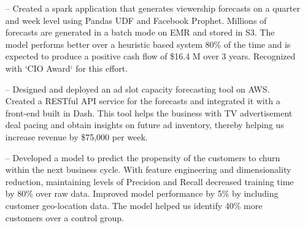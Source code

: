 \documentclass[10pt,a4paper]{altacv}
\begin{document}
\tagline{}

%

\begin{fullwidth}
\makecvheader
\end{fullwidth}

%





\begin{itemize}
    \setlength{\itemindent}{0.5em}
    \item[--]   \small{Created a spark application that generates viewership forecasts on a quarter and week level using Pandas UDF and Facebook Prophet. Millions of forecasts are generated in a batch mode on EMR and stored in S3. The model performs better over a heuristic based system 80\% of the time and is expected to produce a positive cash flow of \$16.4 M over 3 years. Recognized with `CIO Award` for this effort.}
    \item[--]   \small{Designed and deployed an ad slot capacity forecasting tool on AWS. Created a RESTful API service for the forecasts and integrated it with a front-end built in Dash. This tool helps the business with TV advertisement deal pacing and obtain insights on future ad inventory, thereby helping us increase revenue by \$75,000 per week.}
    \item[--]   \small{Developed a model to predict the propensity of the customers to churn within the next business cycle. With feature engineering and dimensionality reduction, maintaining levels of Precision and Recall decreased training time by 80\% over raw data. Improved model performance by 5\% by including customer geo-location data. The model helped us identify 40\% more customers over a control group.}
\end{itemize}
\end{document}
